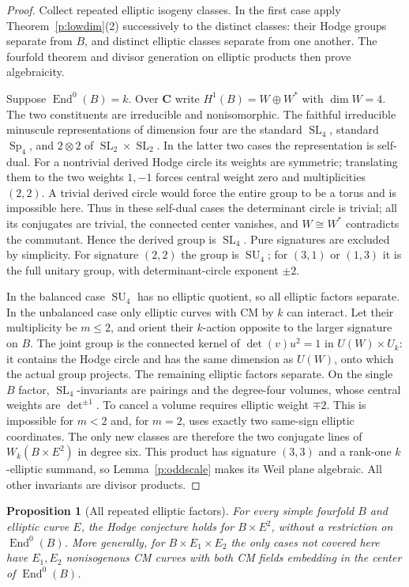 \documentclass[10pt,reqno]{article}
\theoremstyle{emphasizedplain}
\newtheorem{proposition}[theorem]{Proposition}
\theoremstyle{emphasizeddefinition}
\theoremstyle{emphasizeddefinition}
\DeclareMathOperator{\End}{End}
\DeclareMathOperator{\Sp}{Sp}
\DeclareMathOperator{\SL}{SL}
\DeclareMathOperator{\SU}{SU}
\newcommand{\C}{\mathbf C}
\begin{document}
\begin{proof}
Collect repeated elliptic isogeny classes. In the first case apply
Theorem~\ref{p:lowdim}(2) successively to the distinct classes: their
Hodge groups separate from $B$, and distinct elliptic classes separate
from one another. The fourfold theorem and divisor generation on
elliptic products then prove algebraicity.

Suppose $\End^0(B)=k$. Over $\C$ write $H^1(B)=W\oplus W^*$ with
$\dim W=4$. The two constituents are irreducible and nonisomorphic.
The faithful irreducible minuscule representations of dimension four
are the standard $\SL_4$, standard $\Sp_4$, and $2\otimes2$ of
$\SL_2\times\SL_2$. In the latter two cases the representation is
self-dual. For a nontrivial derived Hodge circle its weights are
symmetric; translating them to the two weights $1,-1$ forces central
weight zero and multiplicities $(2,2)$. A trivial derived circle would
force the entire group to be a torus and is impossible here.
Thus in these self-dual cases the determinant circle is trivial; all
its conjugates are trivial, the connected center vanishes, and
$W\cong W^*$ contradicts the commutant. Hence the derived group is
$\SL_4$. Pure signatures are excluded by simplicity.
For signature $(2,2)$ the group is $\SU_4$; for $(3,1)$ or $(1,3)$ it
is the full unitary group, with determinant-circle exponent $\pm2$.

In the balanced case $\SU_4$ has no elliptic quotient, so all elliptic
factors separate. In the unbalanced case only elliptic curves with CM
by $k$ can interact. Let their multiplicity be $m\leq2$, and orient
their $k$-action opposite to the larger signature on $B$. The joint
group is the connected kernel of $\det(v)u^2=1$ in $U(W)\times U_k$:
it contains the Hodge circle and has the same dimension as $U(W)$,
onto which the actual group projects. The remaining elliptic factors
separate. On the single $B$ factor, $\SL_4$-invariants are pairings and
the degree-four volumes, whose central weights are $\det^{\pm1}$.
To cancel a volume requires elliptic weight $\mp2$. This is impossible
for $m<2$ and, for $m=2$, uses exactly two same-sign elliptic coordinates.
The only new classes are therefore the two conjugate lines of
$W_k(B\times E^2)$ in degree six. This product has signature $(3,3)$
and a rank-one $k$-elliptic summand, so Lemma~\ref{p:oddscale} makes
its Weil plane algebraic. All other invariants are divisor products.
\end{proof}
\begin{proposition}[All repeated elliptic factors]\label{p:N3repeated}
For every simple fourfold $B$ and elliptic curve $E$, the Hodge
conjecture holds for $B\times E^2$, without a restriction on
$\End^0(B)$. More generally, for $B\times E_1\times E_2$ the
only cases not covered here have $E_1,E_2$ nonisogenous CM curves
with both CM fields embedding in the center of $\End^0(B)$.
\end{proposition}
\end{document}
